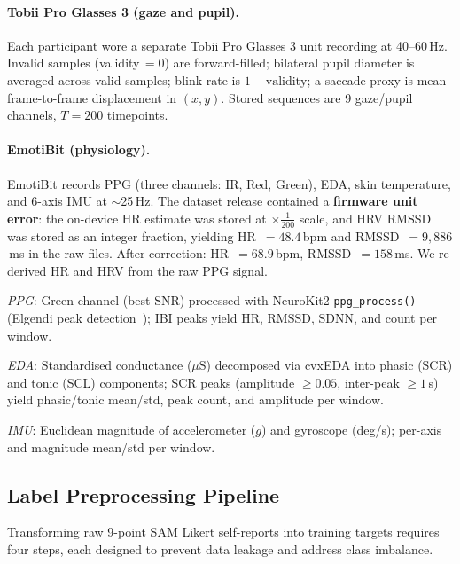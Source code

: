 \documentclass[sigconf,review,anonymous]{acmart}
\begin{document}
\paragraph{Tobii Pro Glasses 3 (gaze and pupil).}
Each participant wore a separate Tobii Pro Glasses 3 unit recording at
40--60\,Hz.
Invalid samples (validity\,$=0$) are forward-filled; bilateral pupil diameter
is averaged across valid samples; blink rate is $1-\overline{\text{validity}}$;
a saccade proxy is mean frame-to-frame displacement in $(x,y)$.
Stored sequences are 9 gaze/pupil channels, $T{=}200$ timepoints.

\paragraph{EmotiBit (physiology).}
EmotiBit records PPG (three channels: IR, Red, Green), EDA, skin temperature,
and 6-axis IMU at $\sim$25\,Hz.
The dataset release contained a \textbf{firmware unit error}: the on-device
HR estimate was stored at $\times\frac{1}{200}$ scale, and HRV RMSSD was
stored as an integer fraction, yielding HR~$= 48.4$\,bpm and
RMSSD~$= 9{,}886$\,ms in the raw files.
After correction: HR~$= 68.9$\,bpm, RMSSD~$= 158$\,ms.
We re-derived HR and HRV from the raw PPG signal.

\textit{PPG}: Green channel (best SNR) processed with NeuroKit2
\texttt{ppg\_process()}~\cite{makowski2021neurokit2} (Elgendi peak
detection~\cite{elgendi2013systolic}); IBI peaks yield HR, RMSSD, SDNN,
and count per window.

\textit{EDA}: Standardised conductance ($\mu$S) decomposed via cvxEDA
\cite{greco2016cvxeda} into phasic (SCR) and tonic (SCL) components;
SCR peaks (amplitude $\geq 0.05$, inter-peak $\geq 1$\,s) yield
phasic/tonic mean/std, peak count, and amplitude per window.

\textit{IMU}: Euclidean magnitude of accelerometer ($g$) and gyroscope
(deg/s); per-axis and magnitude mean/std per window.

\subsection{Label Preprocessing Pipeline}
\label{sec:labelpreproc}

Transforming raw 9-point SAM Likert self-reports into training targets
requires four steps, each designed to prevent data leakage and address
class imbalance.
\end{document}

